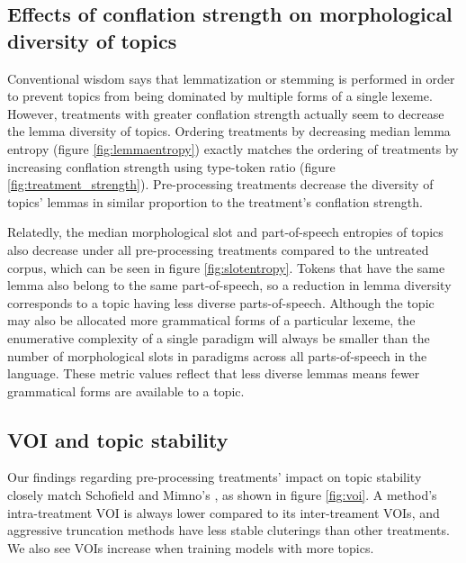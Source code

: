 \documentclass[11pt,a4paper]{article}
\begin{document}
\subsection{Effects of conflation strength on morphological diversity of topics}
Conventional wisdom says that lemmatization or stemming is performed in order to prevent topics from being dominated by multiple forms of a single lexeme. However, treatments with greater conflation strength actually seem to decrease the lemma diversity of topics. Ordering treatments by decreasing median lemma entropy (figure \ref{fig:lemmaentropy}) exactly matches the ordering of treatments by increasing conflation strength using type-token ratio (figure \ref{fig:treatment_strength}). Pre-processing treatments decrease the diversity of topics' lemmas in similar proportion to the treatment's conflation strength.

Relatedly, the median morphological slot and part-of-speech entropies of topics also decrease under all pre-processing treatments compared to the untreated corpus, which can be seen in figure \ref{fig:slotentropy}. Tokens that have the same lemma also belong to the same part-of-speech, so a reduction in lemma diversity corresponds to a topic having less diverse parts-of-speech. Although the topic may also be allocated more grammatical forms of a particular lexeme, the enumerative complexity of a single paradigm will always be smaller than the number of morphological slots in paradigms across all parts-of-speech in the language. These metric values reflect that less diverse lemmas means fewer grammatical forms are available to a topic.


\subsection{VOI and topic stability}
Our findings regarding pre-processing treatments' impact on topic stability closely match Schofield and Mimno's \cite{schofield-mimno-2016-comparing}, as shown in figure \ref{fig:voi}. A method's intra-treatment VOI is always lower compared to its inter-treament VOIs, and aggressive truncation methods have less stable cluterings than other treatments. We also see VOIs increase when training models with more topics.
\end{document}
